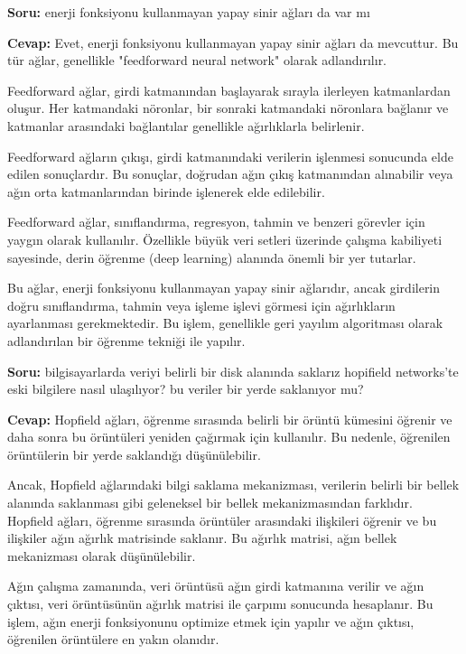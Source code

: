 \documentclass[11pt]{article}
\begin{document}
\textbf{Soru:} enerji fonksiyonu kullanmayan yapay sinir ağları da var mı

\textbf{Cevap:} Evet, enerji fonksiyonu kullanmayan yapay sinir ağları da mevcuttur. Bu tür ağlar, genellikle "feedforward neural network" olarak adlandırılır.

Feedforward ağlar, girdi katmanından başlayarak sırayla ilerleyen katmanlardan oluşur. Her katmandaki nöronlar, bir sonraki katmandaki nöronlara bağlanır ve katmanlar arasındaki bağlantılar genellikle ağırlıklarla belirlenir.

Feedforward ağların çıkışı, girdi katmanındaki verilerin işlenmesi sonucunda elde edilen sonuçlardır. Bu sonuçlar, doğrudan ağın çıkış katmanından alınabilir veya ağın orta katmanlarından birinde işlenerek elde edilebilir.

Feedforward ağlar, sınıflandırma, regresyon, tahmin ve benzeri görevler için yaygın olarak kullanılır. Özellikle büyük veri setleri üzerinde çalışma kabiliyeti sayesinde, derin öğrenme (deep learning) alanında önemli bir yer tutarlar.

Bu ağlar, enerji fonksiyonu kullanmayan yapay sinir ağlarıdır, ancak girdilerin doğru sınıflandırma, tahmin veya işleme işlevi görmesi için ağırlıkların ayarlanması gerekmektedir. Bu işlem, genellikle geri yayılım algoritması olarak adlandırılan bir öğrenme tekniği ile yapılır.


\textbf{Soru:} bilgisayarlarda veriyi belirli bir disk alanında saklarız hopifield networks'te eski bilgilere nasıl ulaşılıyor? bu veriler bir yerde saklanıyor mu?

\textbf{Cevap:} Hopfield ağları, öğrenme sırasında belirli bir örüntü kümesini öğrenir ve daha sonra bu örüntüleri yeniden çağırmak için kullanılır. Bu nedenle, öğrenilen örüntülerin bir yerde saklandığı düşünülebilir.

Ancak, Hopfield ağlarındaki bilgi saklama mekanizması, verilerin belirli bir bellek alanında saklanması gibi geleneksel bir bellek mekanizmasından farklıdır. Hopfield ağları, öğrenme sırasında örüntüler arasındaki ilişkileri öğrenir ve bu ilişkiler ağın ağırlık matrisinde saklanır. Bu ağırlık matrisi, ağın bellek mekanizması olarak düşünülebilir.

Ağın çalışma zamanında, veri örüntüsü ağın girdi katmanına verilir ve ağın çıktısı, veri örüntüsünün ağırlık matrisi ile çarpımı sonucunda hesaplanır. Bu işlem, ağın enerji fonksiyonunu optimize etmek için yapılır ve ağın çıktısı, öğrenilen örüntülere en yakın olanıdır.
\end{document}
